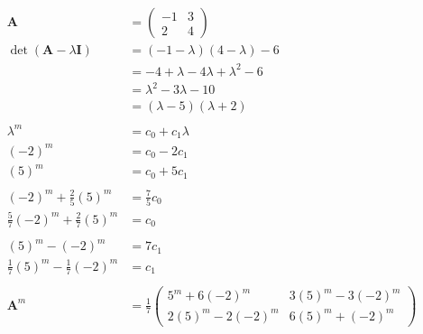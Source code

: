 \documentclass{article}
\begin{document}
\begin{align*}
  \mathbf{A}                             & = \begin{pmatrix}
                                               -1 & 3 \\
                                               2  & 4
                                             \end{pmatrix}                                      \\
  \det (\mathbf{A} - \lambda \mathbf{I}) & = (-1 - \lambda) (4 - \lambda) - 6                    \\
                                         & = -4 + \lambda - 4 \lambda + \lambda^2 - 6            \\
                                         & = \lambda^2 - 3 \lambda - 10                          \\
                                         & = (\lambda - 5) (\lambda + 2)                         \\ \\
  \lambda^m                              & = c_0 + c_1 \lambda                                   \\
  (-2)^m                                 & = c_0 - 2 c_1                                         \\
  (5)^m                                  & = c_0 + 5 c_1                                         \\ \\
  (-2)^m + \frac{2}{5} (5)^m             & = \frac{7}{5} c_0                                     \\
  \frac{5}{7} (-2)^m + \frac{2}{7} (5)^m & = c_0                                                 \\ \\
  (5)^m - (-2)^m                         & = 7 c_1                                               \\
  \frac{1}{7} (5)^m - \frac{1}{7} (-2)^m & = c_1                                                 \\ \\
  \mathbf{A}^m                           & = \frac{1}{7} \begin{pmatrix}
                                                           5^m + 6 (-2)^m     & 3 (5)^m - 3 (-2)^m \\
                                                           2 (5)^m - 2 (-2)^m & 6 (5)^m + (-2)^m
                                                         \end{pmatrix} \\

\end{align*}
\end{document}
